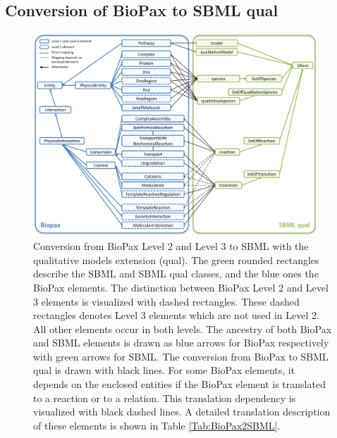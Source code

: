 \documentclass{bioinfo}
\begin{document}
\begin{methods}
\subsection{Conversion of BioPax to SBML qual}
\begin{figure}[t!h]
\centering \includegraphics[width=0.95\textwidth]{BioPaxSBMLqual.png}
\caption{Conversion from BioPax Level 2 and Level 3 to SBML with the qualitative models extension (qual).
The green rounded rectangles describe the SBML and SBML qual classes, and the blue ones the BioPax elements.
The distinction between BioPax Level 2 and Level 3 elements is visualized with dashed rectangles.
These dashed rectangles denotes Level 3 elements which are not used in Level 2.
All other elements occur in both levels.
The ancestry of both BioPax and SBML elements is drawn as blue arrows for BioPax respectively with green arrows for SBML.
The conversion from BioPax to SBML qual is drawn with black lines.
For some BioPax elements, it depends on the enclosed entities if the BioPax element is translated to a reaction or to a relation.
This translation dependency is visualized with black dashed lines.
A detailed translation description of these elements is shown in Table \ref{Tab:BioPax2SBML}.}
\label{fig:BioPaxSBMLqual}
\end{figure}


\end{methods}
\end{document}
